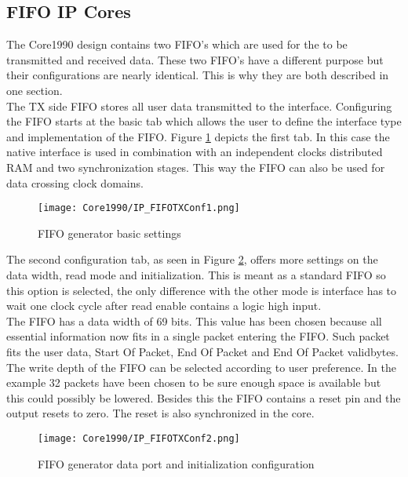 	\newpage

\subsection{FIFO IP Cores}
	The Core1990 design contains two FIFO's which are used for the to be transmitted and received data. These two FIFO's have a different purpose but their configurations are nearly identical. This is why they are both described in one section.\\
	
	The TX side FIFO stores all user data transmitted to the interface. Configuring the FIFO starts at the basic tab which allows the user to define the interface type and implementation of the FIFO. Figure \ref{fig:IP_FIFOTXConf1} depicts the first tab. In this case the native interface is used in combination with an independent clocks distributed RAM and two synchronization stages. This way the FIFO can also be used for data crossing clock domains.
	
	\begin{figure}[H]
		\centering
		\texttt{[image: Core1990/IP\_FIFOTXConf1.png]}	
		\caption{FIFO generator basic settings}
		\label{fig:IP_FIFOTXConf1}
	\end{figure}
	
	The second configuration tab, as seen in Figure \ref{fig:IP_FIFOTXConf2}, offers more settings on the data width, read mode and initialization. This is meant as a standard FIFO so this option is selected, the only difference with the other mode is interface has to wait one clock cycle after read enable contains a logic high input.\\ 
	
	The FIFO has a data width of 69 bits. This value has been chosen because all essential information now fits in a single packet entering the FIFO. Such packet fits the user data, Start Of Packet, End Of Packet and End Of Packet validbytes. \\
	
	The write depth of the FIFO can be selected according to user preference. In the example 32 packets have been chosen to be sure enough space is available but this could possibly be lowered. Besides this the FIFO contains a reset pin and the output resets to zero. The reset is also synchronized in the core.
	
	\begin{figure}[H]
		\centering
		\texttt{[image: Core1990/IP\_FIFOTXConf2.png]}	
		\caption{FIFO generator data port and initialization configuration}
		\label{fig:IP_FIFOTXConf2}
	\end{figure}
	
